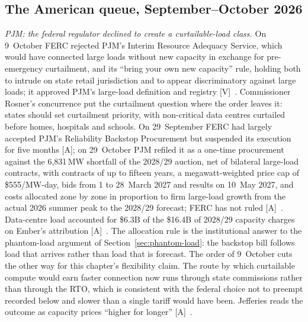 \subsection{The American queue, September--October 2026}
\label{sec:cap-us-queue}

\emph{PJM: the federal regulator declined to create a curtailable-load class.} On 9~October FERC rejected PJM's Interim Resource Adequacy Service, which would have connected large loads without new capacity in exchange for pre-emergency curtailment, and its ``bring your own new capacity'' rule, holding both to intrude on state retail jurisdiction and to appear discriminatory against large loads; it approved PJM's large-load definition and registry [V]~\cite{cap-ferc-pjm-oct}. Commissioner Rosner's concurrence put the curtailment question where the order leaves it: states should set curtailment priority, with non-critical data centres curtailed before homes, hospitals and schools. On 29~September FERC had largely accepted PJM's Reliability Backstop Procurement but suspended its execution for five months [A]; on 29~October PJM refiled it as a one-time procurement against the 6,831\,MW shortfall of the 2028/29 auction, net of bilateral large-load contracts, with contracts of up to fifteen years, a megawatt-weighted price cap of \$555/MW-day, bids from 1 to 28~March 2027 and results on 10~May 2027, and costs allocated zone by zone in proportion to firm large-load growth from the actual 2026 summer peak to the 2028/29 forecast; FERC has not ruled [A]~\cite{cap-pjm-rbp}. Data-centre load accounted for \$6.3B of the \$16.4B of 2028/29 capacity charges on Ember's attribution [A]~\cite{cap-ember-flex}. The allocation rule is the institutional answer to the phantom-load argument of Section~\ref{sec:phantom-load}: the backstop bill follows load that arrives rather than load that is forecast. The order of 9~October cuts the other way for this chapter's flexibility claim. The route by which curtailable compute would earn faster connection now runs through state commissions rather than through the RTO, which is consistent with the federal choice not to preempt recorded below and slower than a single tariff would have been. Jefferies reads the outcome as capacity prices ``higher for longer'' [A]~\cite{cap-ferc-pjm-oct}.

